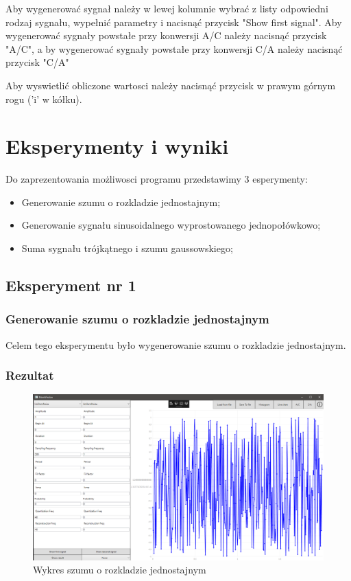 \documentclass[12pt]{article}
\begin{document}
Aby wygenerować sygnał należy w lewej kolumnie wybrać z listy odpowiedni rodzaj sygnału,  wypełnić parametry i nacisnąć przycisk "Show first signal". Aby wygenerować sygnały powstałe przy konwersji A/C należy nacisnąć przycisk "A/C", a by  wygenerować sygnały powstałe przy konwersji C/A należy nacisnąć przycisk "C/A"

Aby wyswietlić obliczone wartosci należy nacisnąć przycisk w prawym górnym rogu ('i' w kółku).
\section{Eksperymenty i wyniki}



Do zaprezentowania możliwosci programu przedstawimy 3 esperymenty:
\begin{itemize}
\item Generowanie szumu o rozkladzie jednostajnym;
\item Generowanie sygnału sinusoidalnego wyprostowanego jednopołówkowo;
\item Suma sygnału trójkątnego i szumu gaussowskiego;
\end{itemize}


\subsection{Eksperyment nr 1 }
\subsubsection{Generowanie szumu o rozkladzie jednostajnym}
Celem tego eksperymentu było wygenerowanie szumu o rozkladzie jednostajnym.


\subsubsection{Rezultat}

\begin{figure}[H]
 \centering
 \includegraphics[width=14cm]{images/uniline.PNG}
 \vspace{-0.3cm}
 \caption{Wykres szumu o rozkladzie jednostajnym}
 \label{gui}
\end{figure}
\end{document}
